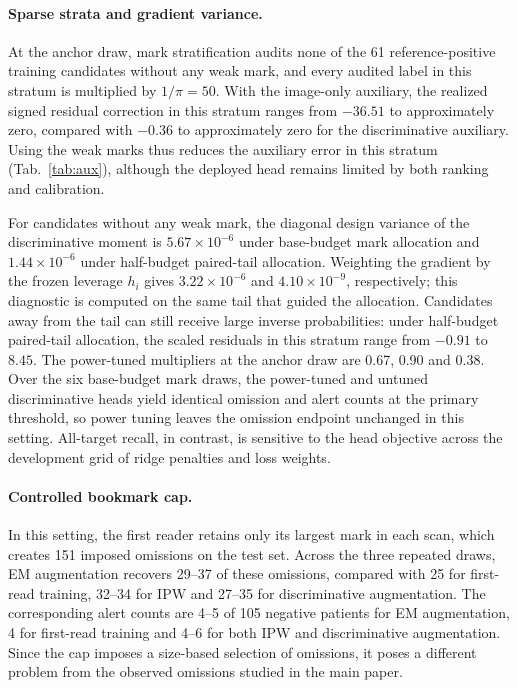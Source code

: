 \paragraph{Sparse strata and gradient variance.}
At the anchor draw, mark stratification audits none of the 61 reference-positive training candidates without any weak mark, and every audited label in this stratum is multiplied by $1/\pi=50$. With the image-only auxiliary, the realized signed residual correction in this stratum ranges from $-36.51$ to approximately zero, compared with $-0.36$ to approximately zero for the discriminative auxiliary. Using the weak marks thus reduces the auxiliary error in this stratum (Tab.~\ref{tab:aux}), although the deployed head remains limited by both ranking and calibration.

For candidates without any weak mark, the diagonal design variance of the discriminative moment is $5.67{\times}10^{-6}$ under base-budget mark allocation and $1.44{\times}10^{-6}$ under half-budget paired-tail allocation. Weighting the gradient by the frozen leverage $h_i$ gives $3.22{\times}10^{-6}$ and $4.10{\times}10^{-9}$, respectively; this diagnostic is computed on the same tail that guided the allocation. Candidates away from the tail can still receive large inverse probabilities: under half-budget paired-tail allocation, the scaled residuals in this stratum range from $-0.91$ to $8.45$. The power-tuned multipliers at the anchor draw are 0.67, 0.90 and 0.38. Over the six base-budget mark draws, the power-tuned and untuned discriminative heads yield identical omission and alert counts at the primary threshold, so power tuning leaves the omission endpoint unchanged in this setting. All-target recall, in contrast, is sensitive to the head objective across the development grid of ridge penalties and loss weights.

\paragraph{Controlled bookmark cap.}
In this setting, the first reader retains only its largest mark in each scan, which creates 151 imposed omissions on the test set. Across the three repeated draws, EM augmentation recovers 29--37 of these omissions, compared with 25 for first-read training, 32--34 for IPW and 27--35 for discriminative augmentation. The corresponding alert counts are 4--5 of 105 negative patients for EM augmentation, 4 for first-read training and 4--6 for both IPW and discriminative augmentation. Since the cap imposes a size-based selection of omissions, it poses a different problem from the observed omissions studied in the main paper.

